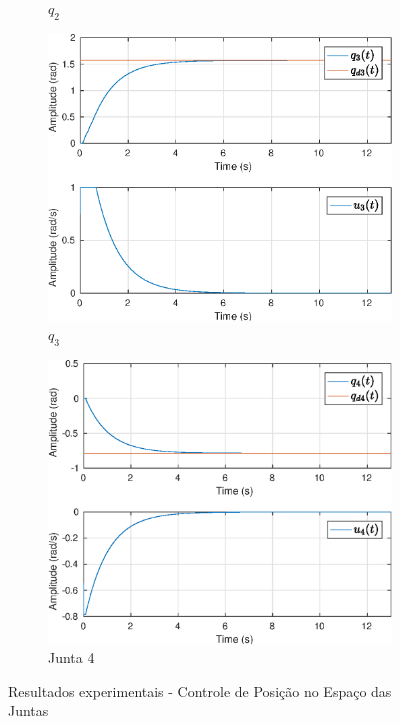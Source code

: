 \begin{figure}[H]
\begin{subfigure}{.5\textwidth}
  \caption{$q_2$}
  \label{fig:sub2}
\end{subfigure}
\begin{subfigure}{.5\textwidth}
  \centering
  \includegraphics[width=\linewidth]{./img/joint_test1/q3.eps}
  \caption{ $q_3$}
  \label{fig:sub1}
\end{subfigure}%
\begin{subfigure}{.5\textwidth}
  \centering
  \includegraphics[width=\linewidth]{./img/joint_test1/q4.eps}
  \caption{Junta 4}
  \label{fig:sub2}
\end{subfigure}
\caption{Resultados experimentais - Controle de Posição no Espaço das Juntas}
\label{fig:test}
\end{figure}


